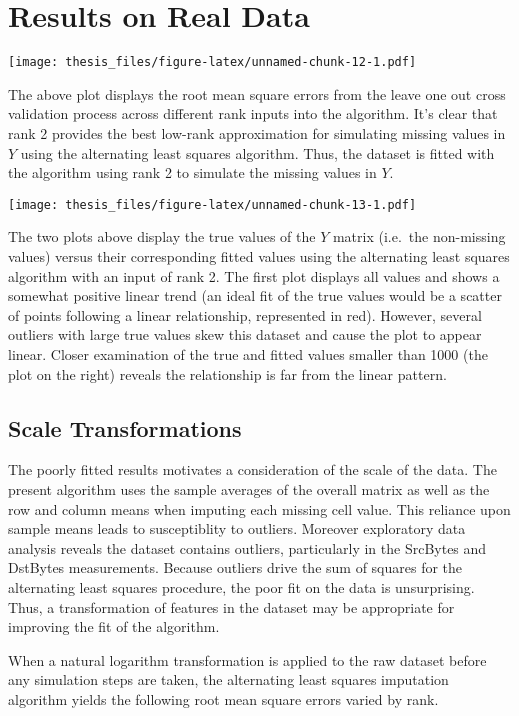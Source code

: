 \documentclass[12pt,twoside]{dukestatscithesis}
\theoremstyle{definition}
\theoremstyle{definition}
\theoremstyle{definition}
\theoremstyle{remark}
\begin{document}
\section{Results on Real Data}\label{results-on-real-data}

\texttt{[image: thesis\_files/figure-latex/unnamed-chunk-12-1.pdf]}

The above plot displays the root mean square errors from the leave one
out cross validation process across different rank inputs into the
algorithm. It's clear that rank 2 provides the best low-rank
approximation for simulating missing values in \(Y\) using the
alternating least squares algorithm. Thus, the dataset is fitted with
the algorithm using rank 2 to simulate the missing values in \(Y\).

\texttt{[image: thesis\_files/figure-latex/unnamed-chunk-13-1.pdf]}

The two plots above display the true values of the \(Y\) matrix
(i.e.~the non-missing values) versus their corresponding fitted values
using the alternating least squares algorithm with an input of rank 2.
The first plot displays all values and shows a somewhat positive linear
trend (an ideal fit of the true values would be a scatter of points
following a linear relationship, represented in red). However, several
outliers with large true values skew this dataset and cause the plot to
appear linear. Closer examination of the true and fitted values smaller
than 1000 (the plot on the right) reveals the relationship is far from
the linear pattern.

\subsection{Scale Transformations}\label{scale-transformations}

The poorly fitted results motivates a consideration of the scale of the
data. The present algorithm uses the sample averages of the overall
matrix as well as the row and column means when imputing each missing
cell value. This reliance upon sample means leads to susceptiblity to
outliers. Moreover exploratory data analysis reveals the dataset
contains outliers, particularly in the SrcBytes and DstBytes
measurements. Because outliers drive the sum of squares for the
alternating least squares procedure, the poor fit on the data is
unsurprising. Thus, a transformation of features in the dataset may be
appropriate for improving the fit of the algorithm.

When a natural logarithm transformation is applied to the raw dataset
before any simulation steps are taken, the alternating least squares
imputation algorithm yields the following root mean square errors varied
by rank.
\end{document}
